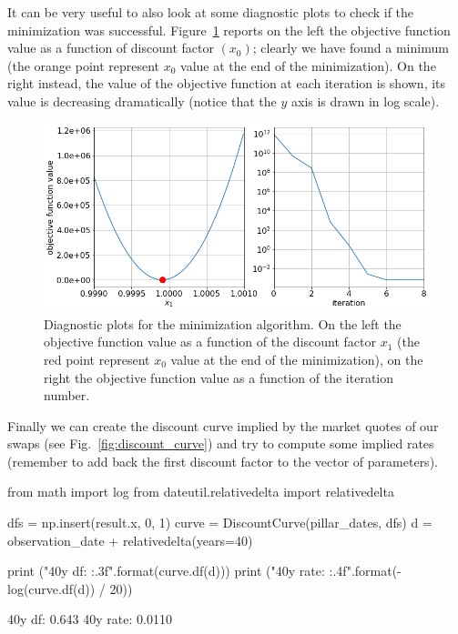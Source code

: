 It can be very useful to also look at some diagnostic plots to check if the minimization was successful. Figure~\ref{fig:minimization_diagnostic} reports on the left the objective function value as a function of discount factor $(x_0)$; clearly we have found a minimum (the orange point represent $x_0$ value at the end of the minimization). On the right instead, the value of the objective function at each iteration is shown, its value is decreasing dramatically (notice that the $y$ axis is drawn in log scale).

\begin{figure}[htb]
	\centering
	\includegraphics[width=0.9\linewidth]{figures/obj_func_diagnostic}
	\caption{Diagnostic plots for the minimization algorithm. On the left the objective function value as a function of the discount factor $x_1$ (the red point represent $x_0$ value at the end of the minimization), on the right the objective function value as a function of the iteration number.}
	\label{fig:minimization_diagnostic}
\end{figure}

Finally we can create the discount curve implied by the market quotes of our swaps (see Fig.~\ref{fig:discount_curve}) and try to compute some implied rates (remember to add back the first discount factor to the vector of parameters).

\begin{ipython}
from math import log
from dateutil.relativedelta import relativedelta

dfs = np.insert(result.x, 0, 1)
curve = DiscountCurve(pillar_dates, dfs)
d = observation_date + relativedelta(years=40)

print ("40y df: {:.3f}".format(curve.df(d)))
print ("40y rate: {:.4f}".format(-log(curve.df(d)) / 20))
\end{ipython}
\begin{ioutput}
40y df: 0.643
40y rate: 0.0110
\end{ioutput}

